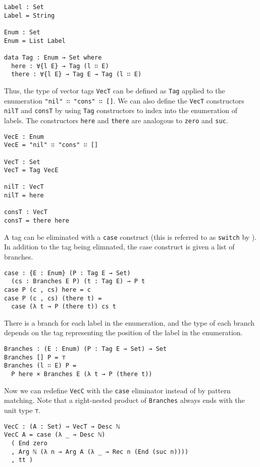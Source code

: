 \documentclass[preprint,nonatbib]{sigplanconf}
\begin{document}
\begin{verbatim}
Label : Set
Label = String

Enum : Set
Enum = List Label

data Tag : Enum → Set where
  here : ∀{l E} → Tag (l ∷ E)
  there : ∀{l E} → Tag E → Tag (l ∷ E)
\end{verbatim}

Thus, the type of vector tags {\tt VecT} can be defined as
{\tt Tag} applied to the enumeration {\tt "nil" ∷ "cons" ∷ []}.
We can also define the {\tt VecT} constructors
{\tt nilT} and {\tt consT} by using
{\tt Tag} constructors to index into the enumeration of labels. The
constructors {\tt here} and {\tt there} are analogous to {\tt zero}
and {\tt suc}.

\begin{verbatim}
VecE : Enum
VecE = "nil" ∷ "cons" ∷ []

VecT : Set
VecT = Tag VecE

nilT : VecT
nilT = here

consT : VecT
consT = there here
\end{verbatim}

A tag can be eliminated with a {\tt case} construct (this is referred to
as {\tt switch} by \citet{Chapman:2010:GAL:1932681.1863547,dagand:phd}).
In addition to the tag being elimnated, the case construct is given a
list of branches.

\begin{verbatim}
case : {E : Enum} (P : Tag E → Set)
  (cs : Branches E P) (t : Tag E) → P t
case P (c , cs) here = c
case P (c , cs) (there t) =
  case (λ t → P (there t)) cs t
\end{verbatim}

There is a branch for each label in the enumeration, and the type of
each branch depends on the tag representing the position of the label
in the enumeration.

\begin{verbatim}
Branches : (E : Enum) (P : Tag E → Set) → Set
Branches [] P = ⊤
Branches (l ∷ E) P =
  P here × Branches E (λ t → P (there t))
\end{verbatim}

Now we can redefine {\tt VecC} with the {\tt case} eliminator instead
of by pattern matching. Note that a right-nested product of
{\tt Branches} always ends with the unit type {\tt ⊤}.

\begin{verbatim}
VecC : (A : Set) → VecT → Desc ℕ
VecC A = case (λ _ → Desc ℕ)
  ( End zero
  , Arg ℕ (λ n → Arg A (λ _ → Rec n (End (suc n))))
  , tt )
\end{verbatim}
\end{document}
